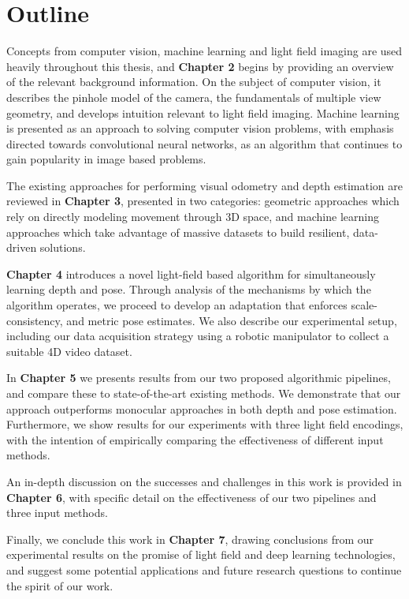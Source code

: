 \section{Outline}
Concepts from computer vision, machine learning and light field imaging are used heavily throughout this thesis, and \textbf{Chapter 2} begins by providing an overview of the relevant background information. On the subject of computer vision, it describes the pinhole model of the camera, the fundamentals of multiple view geometry, and develops intuition relevant to light field imaging. Machine learning is presented as an approach to solving computer vision problems, with emphasis directed towards convolutional neural networks, as an algorithm that continues to gain popularity in image based problems.

The existing approaches for performing visual odometry and depth estimation are reviewed in \textbf{Chapter 3}, presented in two categories: geometric approaches which rely on directly modeling movement through 3D space, and machine learning approaches which take advantage of massive datasets to build resilient, data-driven solutions.

\textbf{Chapter 4} introduces a novel light-field based algorithm for simultaneously learning depth and pose. Through analysis of the mechanisms by which the algorithm operates, we proceed to develop an adaptation that enforces scale-consistency, and metric pose estimates. We also describe our experimental setup, including our data acquisition strategy using a robotic manipulator to collect a suitable 4D video dataset. 

In \textbf{Chapter 5} we presents results from our two proposed algorithmic pipelines, and compare these to state-of-the-art existing methods. We demonstrate that our approach outperforms monocular approaches in both depth and pose estimation. Furthermore, we show results for our experiments with three light field encodings, with the intention of empirically comparing the effectiveness of different input methods.

An in-depth discussion on the successes and challenges in this work is provided in \textbf{Chapter 6}, with specific detail on the effectiveness of our two pipelines and three input methods. 

Finally, we conclude this work in \textbf{Chapter 7}, drawing conclusions from our experimental results on the promise of light field and deep learning technologies, and suggest some potential applications and future research questions to continue the spirit of our work. 

